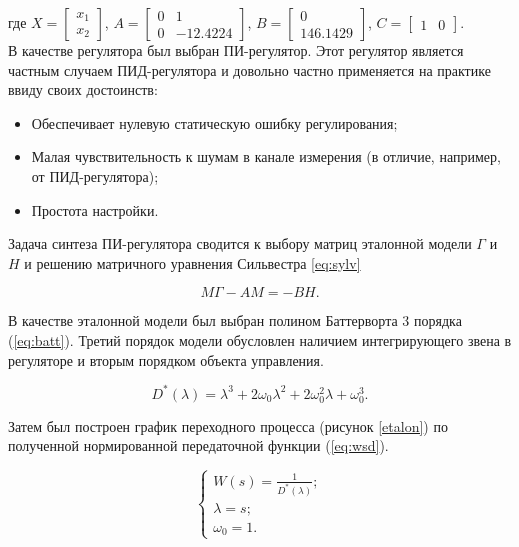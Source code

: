 где $X=\begin{bmatrix}x_1\\x_2\end{bmatrix}$, $A=\begin{bmatrix}0&1\\0& -12.4224\end{bmatrix}$, 
$B=\begin{bmatrix}0\\146.1429\end{bmatrix}$, $C=\begin{bmatrix}1&0\end{bmatrix}$.\\

В качестве регулятора был выбран ПИ-регулятор. Этот регулятор является частным случаем ПИД-регулятора
и довольно частно применяется на практике ввиду своих достоинств:

\begin{itemize}
  \item Обеспечивает нулевую статическую ошибку регулирования;
  \item Малая чувствительность к шумам в канале измерения (в отличие, например, от ПИД-регулятора);
  \item Простота настройки.
\end{itemize}

Задача синтеза ПИ-регулятора сводится к выбору матриц эталонной модели $\Gamma$ и $H$ и 
решению матричного уравнения Сильвестра \ref{eq:sylv}

\begin{equation}
  M\Gamma-AM=-BH.
  \label{eq:sylv}
\end{equation}

В качестве эталонной модели был выбран полином Баттерворта 3 порядка (\ref{eq:batt}). Третий порядок
модели обусловлен наличием интегрирующего звена в регуляторе и вторым порядком
объекта управления.

\begin{equation}
  D^{\text{*}}(\lambda)=\lambda^3+2\omega_0\lambda^2+2\omega_0^2\lambda+\omega_0^3.
  \label{eq:batt}
\end{equation}

Затем был построен график переходного процесса (рисунок \ref{etalon}) по полученной нормированной 
передаточной функции (\ref{eq:wsd}).

\begin{equation}
  \begin{cases}
    W(s)=\frac{1}{D^{\text{*}}(\lambda)};
    \\
    \lambda=s;
    \\
    \omega_0=1.
  \end{cases}
  \label{eq:wsd}
\end{equation}

